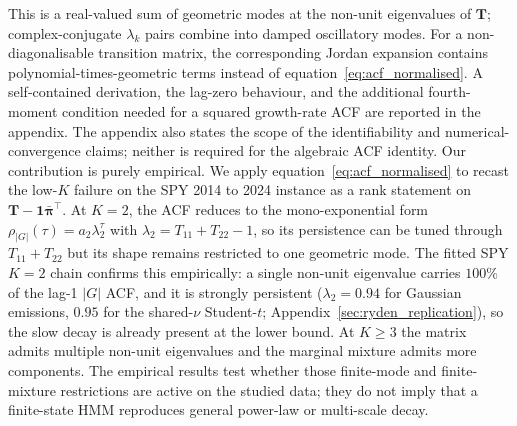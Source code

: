 This is a real-valued sum of geometric modes at the non-unit eigenvalues of $\mathbf T$; complex-conjugate $\lambda_k$ pairs combine into damped oscillatory modes. For a non-diagonalisable transition matrix, the corresponding Jordan expansion contains polynomial-times-geometric terms instead of equation~\eqref{eq:acf_normalised}. A self-contained derivation, the lag-zero behaviour, and the additional fourth-moment condition needed for a squared growth-rate ACF are reported in the appendix. The appendix also states the scope of the identifiability and numerical-convergence claims; neither is required for the algebraic ACF identity. Our contribution is purely empirical. We apply equation~\eqref{eq:acf_normalised} to recast the \citet{ryden1998stylized} low-$K$ failure on the SPY 2014 to 2024 instance as a rank statement on $\mathbf T - \mathbf 1\bar{\boldsymbol\pi}^\top$. At $K = 2$, the ACF reduces to the mono-exponential form $\rho_{|G|}(\tau) = a_2\lambda_2^\tau$ with $\lambda_2 = T_{11} + T_{22} - 1$, so its persistence can be tuned through $T_{11} + T_{22}$ but its shape remains restricted to one geometric mode. The fitted SPY $K = 2$ chain confirms this empirically: a single non-unit eigenvalue carries $100\%$ of the lag-1 $|G|$ ACF, and it is strongly persistent ($\lambda_2 = 0.94$ for Gaussian emissions, $0.95$ for the shared-$\nu$ Student-$t$; Appendix~\ref{sec:ryden_replication}), so the slow decay is already present at the lower bound. At $K \ge 3$ the matrix admits multiple non-unit eigenvalues and the marginal mixture admits more components. The empirical results test whether those finite-mode and finite-mixture restrictions are active on the studied data; they do not imply that a finite-state HMM reproduces general power-law or multi-scale decay.
